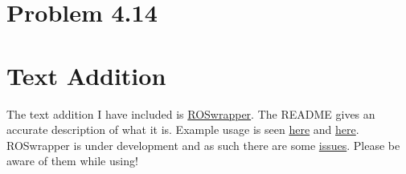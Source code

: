 \documentclass{article}
\begin{document}
\newpage
\section{\textbf{Problem 4.14}}


\newpage
\section{\textbf{Text Addition}}
The text addition I have included is \href{https://github.com/macattackftw/ROSwrapper}{ROSwrapper}. The README gives an accurate description of what it is. Example usage is seen \href{https://github.com/macattackftw/ROSwrapper/blob/master/example_basenode.py}{here} and \href{https://github.com/macattackftw/ROSwrapper/blob/master/example_derivednode.py}{here}. ROSwrapper is under development and as such there are some \href{https://github.com/macattackftw/ROSwrapper/issues}{issues}. Please be aware of them while using!
\end{document}
